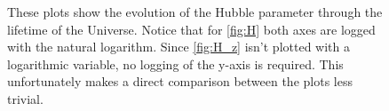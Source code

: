 \documentclass[a4paper,norsk, 10pt]{article}
\begin{document}
\begin{figure}[ht]
     \centering
     \caption{These plots show the evolution of the Hubble parameter through the lifetime of the Universe. Notice that for \ref{fig:H} both axes are logged with the natural logarithm. Since \ref{fig:H_z} isn't plotted with a logarithmic variable, no logging of the y-axis is required. This unfortunately makes a direct comparison between the plots less trivial.}
     \label{fig:Hs}
  
\end{figure}
\end{document}
